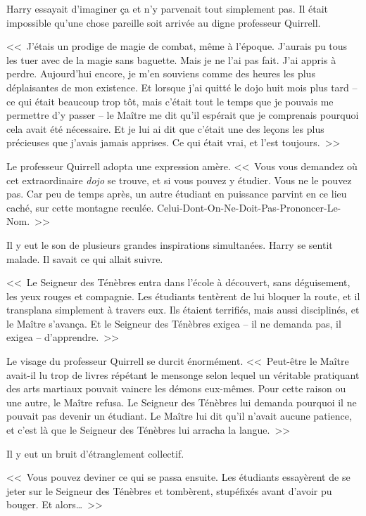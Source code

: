 Harry essayait d'imaginer ça et n'y parvenait tout simplement pas. Il était impossible qu'une chose pareille soit arrivée au digne professeur Quirrell.

<<~J'étais un prodige de magie de combat, même à l'époque. J'aurais pu tous les tuer avec de la magie sans baguette. Mais je ne l'ai pas fait. J'ai appris à perdre. Aujourd'hui encore, je m'en souviens comme des heures les plus déplaisantes de mon existence. Et lorsque j'ai quitté le dojo huit mois plus tard -- ce qui était beaucoup trop tôt, mais c'était tout le temps que je pouvais me permettre d'y passer -- le Maître me dit qu'il espérait que je comprenais pourquoi cela avait été nécessaire. Et je lui ai dit que c'était une des leçons les plus précieuses que j'avais jamais apprises. Ce qui était vrai, et l'est toujours.~>>

Le professeur Quirrell adopta une expression amère. <<~Vous vous demandez où cet extraordinaire \emph{dojo} se trouve, et si vous pouvez y étudier. Vous ne le pouvez pas. Car peu de temps après, un autre étudiant en puissance parvint en ce lieu caché, sur cette montagne reculée. Celui-Dont-On-Ne-Doit-Pas-Prononcer-Le-Nom.~>>

Il y eut le son de plusieurs grandes inspirations simultanées. Harry se sentit malade. Il savait ce qui allait suivre.

<<~Le Seigneur des Ténèbres entra dans l'école à découvert, sans déguisement, les yeux rouges et compagnie. Les étudiants tentèrent de lui bloquer la route, et il transplana simplement à travers eux. Ils étaient terrifiés, mais aussi disciplinés, et le Maître s'avança. Et le Seigneur des Ténèbres exigea -- il ne demanda pas, il exigea -- d'apprendre.~>>

Le visage du professeur Quirrell se durcit énormément. <<~Peut-être le Maître avait-il lu trop de livres répétant le mensonge selon lequel un véritable pratiquant des arts martiaux pouvait vaincre les démons eux-mêmes. Pour cette raison ou une autre, le Maître refusa. Le Seigneur des Ténèbres lui demanda pourquoi il ne pouvait pas devenir un étudiant. Le Maître lui dit qu'il n'avait aucune patience, et c'est là que le Seigneur des Ténèbres lui arracha la langue.~>>

Il y eut un bruit d'étranglement collectif.

<<~Vous pouvez deviner ce qui se passa ensuite. Les étudiants essayèrent de se jeter sur le Seigneur des Ténèbres et tombèrent, stupéfixés avant d'avoir pu bouger. Et alors…~>>

